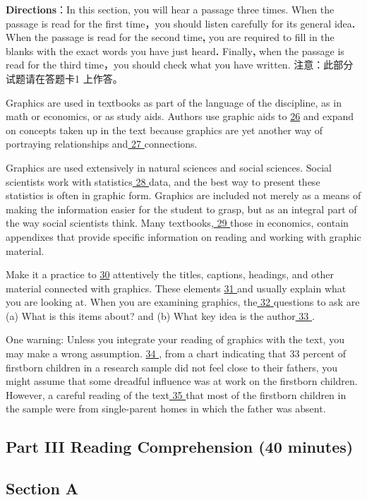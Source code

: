 \documentclass[UTF8,11pt]{ctexart}
\begin{document}
\textbf{Directions}：In this section, you will hear a passage three times. When the passage is read for the first time，you should listen carefully for its general idea\textbf{.} When the passage is read for the second time\textbf{,} you are required to fill in the blanks with the exact words you have just heard\textbf{.} Finally\textbf{,} when the passage is read for the third time，you should check what you have written. 注意：此部分试题请在答题卡1 上作答。


Graphics are used in textbooks as part of the language of the discipline, as in math or economics, or as study aids. Authors use graphic aids to \uline{26} and expand on concepts taken up in the text because graphics are yet another way of portraying relationships and\uline{ 27 }connections.


Graphics are used extensively in natural sciences and social sciences. Social scientists work with statistics\uline{ 28 }data, and the best way to present these statistics is often in graphic form. Graphics are included not merely as a means of making the information easier for the student to grasp, but as an integral part of the way social scientists think. Many textbooks,\uline{ 29 }those in economics, contain appendixes that provide specific information on reading and working with graphic material.


Make it a practice to \uline{30} attentively the titles, captions, headings, and other material connected with graphics. These elements \uline{31 }and usually explain what you are looking at. When you are examining graphics, the\uline{ 32 }questions to ask are (a) What is this items about? and (b) What key idea is the author\uline{ 33 }.


One warning: Unless you integrate your reading of graphics with the text, you may make a wrong assumption. \uline{34 }, from a chart indicating that 33 percent of firstborn children in a research sample did not feel close to their fathers, you might assume that some dreadful influence was at work on the firstborn children. However, a careful reading of the text\uline{ 35 }that most of the firstborn children in the sample were from single-parent homes in which the father was absent.


\subsection*{\textbf{Part} III \textbf{Reading Comprehension} \textbf{(40 minutes)}}


\subsection*{\textbf{Section A}}
\end{document}
